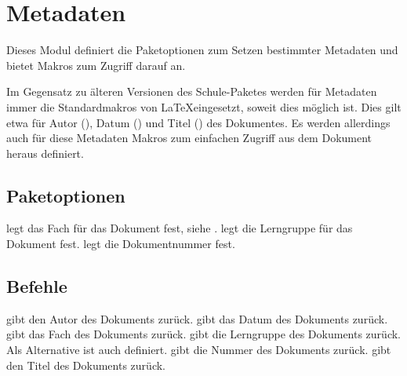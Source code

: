 \section{Metadaten}
\label{modul:metadaten}
Dieses Modul definiert die Paketoptionen zum Setzen bestimmter Metadaten 
und bietet Makros zum Zugriff darauf an.

Im Gegensatz zu älteren Versionen des Schule-Paketes werden für Metadaten
immer die Standardmakros von \LaTeX\space eingesetzt, soweit dies
möglich ist. Dies gilt etwa für Autor (), Datum 
() und Titel () des 
Dokumentes. Es werden allerdings auch für diese Metadaten Makros zum
 einfachen Zugriff aus dem Dokument heraus definiert.

\subsection{Paketoptionen}
\begin{options}
		legt das Fach für das Dokument fest, siehe .
		legt die Lerngruppe für das Dokument fest.
		legt die Dokumentnummer fest.
\end{options}

\subsection{Befehle}
\begin{commands}
		gibt den Autor des Dokuments zurück.
		gibt das Datum des Dokuments zurück.
		gibt das Fach des Dokuments zurück.
		gibt die Lerngruppe des Dokuments zurück. Als Alternative ist auch  definiert.
		gibt die Nummer des Dokuments zurück.
		gibt den Titel des Dokuments zurück.	
\end{commands}